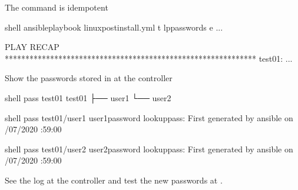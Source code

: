 \documentclass[letterpaper,10pt,english]{sphinxmanual}
\begin{document}
The command is idempotent

%
\begin{sphinxVerbatim}[commandchars=\\\{\}]
shell\PYGZgt{} ansible\PYGZhy{}playbook linux\PYGZhy{}postinstall.yml \PYGZhy{}t lp\PYGZus{}passwords 
                                    \PYGZhy{}e 
...

PLAY RECAP *************************************************************
test\PYGZus{}01:       ...
\end{sphinxVerbatim}
\sphinxresetverbatimhllines

Show the passwords stored in  at the controller

%
\begin{sphinxVerbatim}[commandchars=\\\{\}]
shell\PYGZgt{} pass test\PYGZus{}01
test\PYGZus{}01
├── user1
└── user2

shell\PYGZgt{} pass test\PYGZus{}01/user1
user1\PYGZus{}password
lookup\PYGZus{}pass: First generated by ansible on /07/2020 :59:00

shell\PYGZgt{} pass test\PYGZus{}01/user2
user2\PYGZus{}password
lookup\PYGZus{}pass: First generated by ansible on /07/2020 :59:00
\end{sphinxVerbatim}
\sphinxresetverbatimhllines

See the  log at the controller  and test the
new passwords at .
\label{\detokenize{guide:ug-task-passwords-passwordstore}}
\ignorespaces 
\end{document}
